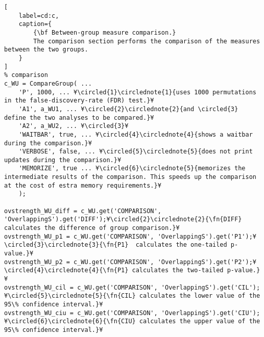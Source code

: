 \documentclass{tufte-handout}
\begin{document}
\begin{lstlisting}[
	label=cd:c,
	caption={
		{\bf Between-group measure comparison.}
		The comparison section performs the comparison of the measures between the two groups.
	}
]
% comparison
c_WU = CompareGroup( ...
    'P', 1000, ... ¥\circled{1}\circlednote{1}{uses 1000 permutations in the false-discovery-rate (FDR) test.}¥
    'A1', a_WU1, ... ¥\circled{2}\circlednote{2}{and \circled{3} define the two analyses to be compared.}¥
    'A2', a_WU2, ... ¥\circled{3}¥
    'WAITBAR', true, ... ¥\circled{4}\circlednote{4}{shows a waitbar during the comparison.}¥
    'VERBOSE', false, ... ¥\circled{5}\circlednote{5}{does not print updates during the comparison.}¥
    'MEMORIZE', true ... ¥\circled{6}\circlednote{5}{memorizes the intermediate results of the comparison. This speeds up the comparison at the cost of estra memory requirements.}¥
    );

ovstrength_WU_diff = c_WU.get('COMPARISON', 'OverlappingS').get('DIFF');¥\circled{2}\circlednote{2}{\fn{DIFF} calculates the difference of group comparison.}¥
ovstrength_WU_p1 = c_WU.get('COMPARISON', 'OverlappingS').get('P1');¥\circled{3}\circlednote{3}{\fn{P1}  calculates the one-tailed p-value.}¥
ovstrength_WU_p2 = c_WU.get('COMPARISON', 'OverlappingS').get('P2');¥\circled{4}\circlednote{4}{\fn{P1} calculates the two-tailed p-value.}¥
ovstrength_WU_cil = c_WU.get('COMPARISON', 'OverlappingS').get('CIL');¥\circled{5}\circlednote{5}{\fn{CIL} calculates the lower value of the 95\% confidence interval.}¥
ovstrength_WU_ciu = c_WU.get('COMPARISON', 'OverlappingS').get('CIU');¥\circled{6}\circlednote{6}{\fn{CIU} calculates the upper value of the 95\% confidence interval.}¥
\end{lstlisting}
\end{document}
